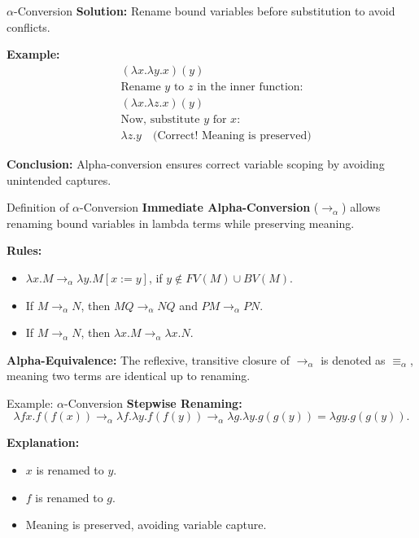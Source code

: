 \documentclass{beamer}
\begin{document}
\begin{frame}{$\alpha$-Conversion}
  \textbf{Solution:} Rename bound variables before substitution to avoid conflicts.
  
  \vspace{0.5cm}
  \textbf{Example:}
  \begin{align*}
      & (\lambda x. \lambda y. x) (y) \\
      & \text{Rename } y \text{ to } z \text{ in the inner function:}\\
      & (\lambda x. \lambda z. x) (y) \\
      & \text{Now, substitute } y \text{ for } x:\\
      & \lambda z. y \quad \text{(Correct! Meaning is preserved)}
  \end{align*}

  \vspace{0.5cm}
  \textbf{Conclusion:} Alpha-conversion ensures correct variable scoping by avoiding unintended captures.
\end{frame}

\begin{frame}{Definition of $\alpha$-Conversion}
  \textbf{Immediate Alpha-Conversion} ($\rightarrow_{\alpha}$) allows renaming bound variables in lambda terms while preserving meaning.
  
  \vspace{0.5cm}
  \textbf{Rules:}
  \begin{itemize}
      \item $\lambda x. M \rightarrow_{\alpha} \lambda y. M[x := y]$, if $y \notin FV(M) \cup BV(M)$.
      \item If $M \rightarrow_{\alpha} N$, then $MQ \rightarrow_{\alpha} NQ$ and $PM \rightarrow_{\alpha} PN$.
      \item If $M \rightarrow_{\alpha} N$, then $\lambda x. M \rightarrow_{\alpha} \lambda x. N$.
  \end{itemize}
  
  \vspace{0.5cm}
  \textbf{Alpha-Equivalence:} The reflexive, transitive closure of $\rightarrow_{\alpha}$ is denoted as $\equiv_{\alpha}$, meaning two terms are identical up to renaming.
\end{frame}

\begin{frame}{Example: $\alpha$-Conversion}
  \textbf{Stepwise Renaming:}
  \[
      \lambda fx. f(f(x)) \rightarrow_{\alpha} \lambda f. \lambda y. f(f(y)) 
      \rightarrow_{\alpha} \lambda g. \lambda y. g(g(y)) 
      = \lambda gy. g(g(y)).
  \]
  
  \textbf{Explanation:}
  \begin{itemize}
      \item $x$ is renamed to $y$.
      \item $f$ is renamed to $g$.
      \item Meaning is preserved, avoiding variable capture.
  \end{itemize}
\end{frame}
\end{document}
